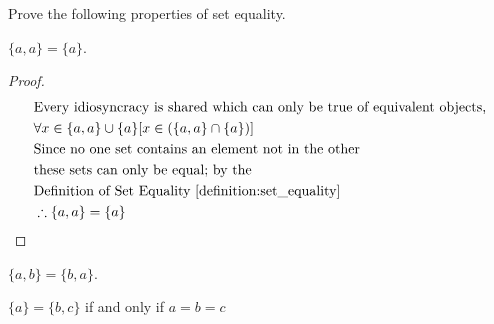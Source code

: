 \begin{question}
  Prove the following properties of set equality.

  \begin{subquestion}
    $\{a, a\} = \{ a \}$.
  \end{subquestion}
  \begin{proof}
    \begin{align*}
      & \text{Every idiosyncracy is shared which can only be true of equivalent objects,} \\
      & \forall x \in \{a, a\} \cup \{ a \} [x \in (\{a, a\} \cap \{ a \})] \\
      & \text{Since no one set contains an element not in the other} \\
      & \text{these sets can only be equal; by the} \\
      & \text{Definition of Set Equality \ref{definition:set_equality}} \\
      & \therefore \{a, a\} = \{ a \}
    \end{align*}
  \end{proof}

  \begin{subquestion}
    $\{a, b\} = \{b, a\}$.
  \end{subquestion}

  \begin{subquestion}
    $\{a\} = \{b, c\}$ if and only if $a = b = c$
  \end{subquestion}

\end{question}

\begin{question}
\end{question}

\begin{question}
\end{question}

\begin{question}
\end{question}

\begin{question}
\end{question}

\begin{question}
\end{question}

\begin{question}
\end{question}

\begin{question}
\end{question}

